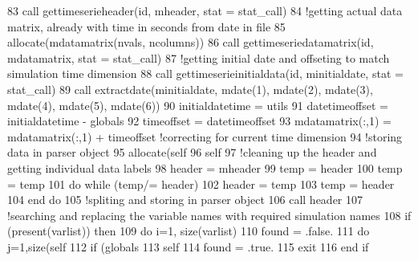 \begin{DoxyCode}
83     \textcolor{keyword}{call }gettimeserieheader(id, mheader, stat = stat\_call)
84     \textcolor{comment}{!getting actual data matrix, already with time in seconds from date in file}
85     \textcolor{keyword}{allocate}(mdatamatrix(nvals, ncolumns))
86     \textcolor{keyword}{call }gettimeseriedatamatrix(id, mdatamatrix, stat = stat\_call)
87     \textcolor{comment}{!getting initial date and offseting to match simulation time dimension}
88     \textcolor{keyword}{call }gettimeserieinitialdata(id, minitialdate, stat = stat\_call)
89     \textcolor{keyword}{call }extractdate(minitialdate, mdate(1), mdate(2), mdate(3), mdate(4), mdate(5), mdate(6))
90     initialdatetime = utils%
91     datetimeoffset = initialdatetime - globals%
92     timeoffset = datetimeoffset%
93     mdatamatrix(:,1) = mdatamatrix(:,1) + timeoffset \textcolor{comment}{!correcting for current time dimension}
94     \textcolor{comment}{!storing data in parser object}
95     \textcolor{keyword}{allocate}(self%
96     self%
97     \textcolor{comment}{!cleaning up the header and getting individual data labels}
98     header = mheader
99     temp = header%
100     temp = temp%
101     \textcolor{keywordflow}{do} \textcolor{keywordflow}{while} (temp/= header)
102         header = temp
103         temp = header%
104 \textcolor{keywordflow}{    end do}
105     \textcolor{comment}{!spliting and storing in parser object}
106     \textcolor{keyword}{call }header%
107     \textcolor{comment}{!searching and replacing the variable names with required simulation names}
108     \textcolor{keywordflow}{if} (\textcolor{keyword}{present}(varlist)) \textcolor{keywordflow}{then}
109         \textcolor{keywordflow}{do} i=1, \textcolor{keyword}{size}(varlist)
110             found = .false.
111             \textcolor{keywordflow}{do} j=1,\textcolor{keyword}{size}(self%
112                 \textcolor{keywordflow}{if} (globals%
113                     self%
114                     found = .true.
115                     \textcolor{keywordflow}{exit}
116 \textcolor{keywordflow}{                end if}

\end{DoxyCode}
